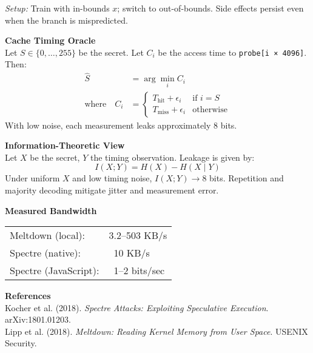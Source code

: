 \begin{technical}
\textit{Setup:} Train with in-bounds \( x \); switch to out-of-bounds. Side effects persist even when the branch is mispredicted.

\vspace{0.4em}
\textbf{Cache Timing Oracle}\\[0.5em]
Let \( S \in \{0,\dots,255\} \) be the secret. Let \( C_i \) be the access time to \texttt{probe[i × 4096]}. Then:
\[
\begin{aligned}
\hat{S} &= \arg\min_i C_i \\
\text{where} \quad
C_i &= 
\begin{cases}
T_\text{hit} + \epsilon_i & \text{if } i = S \\
T_\text{miss} + \epsilon_i & \text{otherwise}
\end{cases}
\end{aligned}
\]
With low noise, each measurement leaks approximately 8 bits.

\vspace{0.4em}
\textbf{Information-Theoretic View}\\[0.5em]
Let \( X \) be the secret, \( Y \) the timing observation. Leakage is given by:
\[
I(X; Y) = H(X) - H(X \mid Y)
\]
Under uniform \( X \) and low timing noise, \( I(X; Y) \to 8 \) bits. Repetition and majority decoding mitigate jitter and measurement error.

\vspace{0.4em}
\textbf{Measured Bandwidth}\\[0.5em]
\begin{tabular}{@{}ll@{}}
Meltdown (local):     & 3.2–503 KB/s \\
Spectre (native):     & ~10 KB/s \\
Spectre (JavaScript): & ~1–2 bits/sec \\
\end{tabular}

\vspace{0.5em}
\textbf{References}\\
Kocher et al. (2018). \textit{Spectre Attacks: Exploiting Speculative Execution}. arXiv:1801.01203.\\
Lipp et al. (2018). \textit{Meltdown: Reading Kernel Memory from User Space}. USENIX Security.\\
\end{technical}

